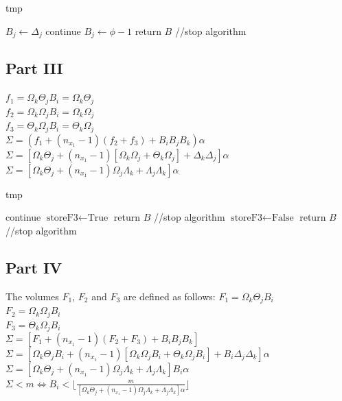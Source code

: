 \documentclass[conference]{IEEEtran}
\begin{document}
  \begin{algorithm}[h]
    \caption{tmp}
    \begin{algorithmic}[1]
      \STATE $B_j \leftarrow \Delta_j$
      \STATE continue
    \ELSE
      \STATE $B_j \leftarrow \phi - 1$
      \STATE return $B$ //stop algorithm
    \ENDIF
    \end{algorithmic}
  \end{algorithm}

  \subsection{Part III}
  \noindent $f_1 = \Omega_k \Theta_j B_i = \Omega_k \Theta_j $ \\
  $f_2 = \Omega_k \Omega_j B_i = \Omega_k \Omega_j $ \\
  $f_3 = \Theta_k \Omega_j B_i = \Theta_k \Omega_j $ \\

  \noindent $\Sigma = (f_1 + (n_{x_1} - 1)(f_2 + f_3) + B_iB_jB_k)\alpha$
  $\Sigma = [ \Omega_k\Theta_j + (n_{x_1} - 1)[\Omega_k \Omega_j + \Theta_k \Omega_j] + \Delta_k\Delta_j]\alpha$ \\
  $\Sigma = [\Omega_k\Theta_j + (n_{x_1}-1)\Omega_j\Lambda_k + \Lambda_j\Lambda_k]\alpha$

  \begin{algorithm}[h]
    \caption{tmp}
    \begin{algorithmic}[1]
      \STATE continue
      \STATE $\textrm{storeF3} \leftarrow \textrm{True}$
      \STATE return $B$ //stop algorithm
    \ELSE
      \STATE $\textrm{storeF3} \leftarrow \textrm{False}$
      \STATE return $B$ //stop algorithm
    \ENDIF
    \end{algorithmic}
  \end{algorithm}

  \subsection{Part IV}
  The volumes $F_1$, $F_2$ and $F_3$ are defined as follows:
  \noindent $F_1 = \Omega_k \Theta_j B_i$ \\
  $F_2 = \Omega_k \Omega_j B_i$ \\
  $F_3 = \Theta_k \Omega_j B_i$ \\

  \noindent $\Sigma = [ F_1 + (n_{x_1} - 1)(F_2 + F_3) + B_iB_jB_k ]$ \\
  $\Sigma = [\Omega_k\Theta_jB_i + (n_{x_1} - 1)[\Omega_k\Omega_jB_i + \Theta_k\Omega_jB_i] + B_i\Delta_j\Delta_k]\alpha$ \\
  $\Sigma = [\Omega_k\Theta_j + (n_{x_1}-1)\Omega_j\Lambda_k + \Lambda_j\Lambda_k]B_i\alpha$ \\
  $\Sigma < m \Leftrightarrow B_i < \lfloor \frac{m}{[\Omega_k\Theta_j + (n_{x_1}-1)\Omega_j\Lambda_k + \Lambda_j\Lambda_k]\alpha} \rfloor$
\end{document}
